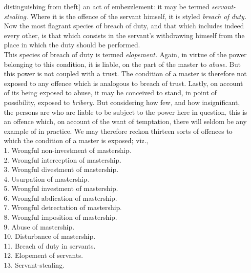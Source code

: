 \documentclass[12pt]{report}
\begin{document}
distinguishing from theft) an act of embezzlement: it may be termed
\emph{servant-stealing.} Where it is the offence of the servant himself,
it is styled \emph{breach of duty.} Now the most flagrant species of
breach of duty, and that which includes indeed every other, is that
which consists in the servant's withdrawing himself from the place in
which the duty should be performed.\\
This species of breach of duty is termed \emph{elopement.} Again, in
virtue of the power belonging to this condition, it is liable, on the
part of the master to \emph{abuse.} But this power is not coupled with a
trust. The condition of a master is therefore not exposed to any offence
which is analogous to breach of trust. Lastly, on account of its being
exposed to abuse, it may be conceived to stand, in point of possibility,
exposed to \emph{bribery.} But considering how few, and how
insignificant, the persons are who are liable to be subject to the power
here in question, this is an offence which, on account of the want of
temptation, there will seldom be any example of in practice. We may
therefore reckon thirteen sorts of offences to which the condition of a
master is exposed; viz.,\\
1. Wrongful non-investment of mastership.\\
2. Wrongful interception of mastership.\\
3. Wrongful divestment of mastership.\\
4. Usurpation of mastership.\\
5. Wrongful investment of mastership.\\
6. Wrongful abdication of mastership.\\
7. Wrongful detrectation of mastership.\\
8. Wrongful imposition of mastership.\\
9. Abuse of mastership.\\
10. Disturbance of mastership.\\
11. Breach of duty in servants.\\
12. Elopement of servants.\\
13. Servant-stealing.
\end{document}
